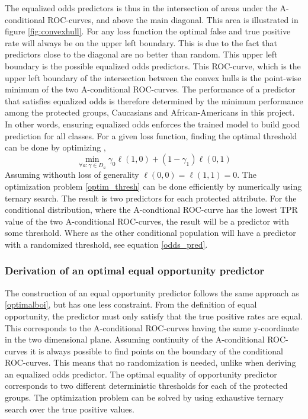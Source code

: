 \documentclass[11pt, fleqn, titlepage]{article}
\begin{document}
	The equalized odds predictors is thus in the intersection of areas under the A-conditional ROC-curves, and above the main diagonal. This area is illustrated in figure \ref{fig:convexhull}. For any loss function the optimal false and true positive rate will always be on the upper left boundary. This is due to the fact that predictors close to the diagonal are no better than random. This upper left boundary is the possible equalized odds predictors. This ROC-curve, which is the upper left boundary of the intersection between the convex hulls is the point-wise minimum of the two A-conditional ROC-curves. The performance of a predictor that satisfies equalized odds is therefore determined by the minimum performance among the protected groups, Caucasians and African-Americans in this project. In other words, ensuring equalized odds enforces the trained model to build good prediction for all classes. For a given loss function, finding the optimal threshold can be done by optimizing ,
	\begin{equation}\label{optim_thresh}
	\min _{\forall a: \gamma \in D_{a}} \gamma_{0} \ell(1,0)+\left(1-\gamma_{1}\right) \ell(0,1)
	\end{equation}
	Assuming withouth loss of generality $ \ell (0,0) = \ell(1,1)=0 $.
	The optimization problem \ref{optim_thresh} can be done efficiently by numerically using ternary search. The result is two predictors for each protected attribute. For the conditional distribution, where the A-condtional ROC-curve has the lowest TPR value of the two A-conditional ROC-curves, the result will be a predictor with some threshold. Where as the other conditional population will have a predictor with a randomized threshold, see equation \ref{odds_pred}. \cite{equal_of_oppor}
	\subsubsection{Derivation of an optimal equal opportunity predictor}
	
	The construction of an equal opportunity predictor follows the same approach as \ref{optimalboi}, but has one less constraint. From the definition of equal opportunity, the predictor must only satisfy that the true positive rates are equal. This corresponds to the A-conditional ROC-curves having the same y-coordinate in the two dimensional plane. Assuming continuity of the A-conditional ROC-curves it is always possible to find points on the boundary of the conditional ROC-curves. This means that no randomization is needed, unlike when deriving an equalized odds predictor. The optimal equality of opportunity predictor corresponds to two different deterministic thresholds for each of the protected groups. The optimization problem can be solved by using exhaustive ternary search over the true positive values. \cite{equal_of_oppor}
	
\end{document}

